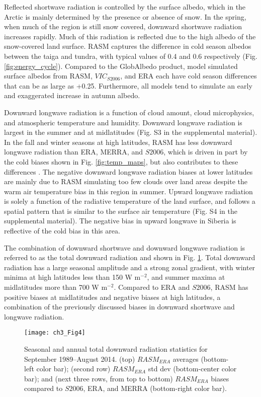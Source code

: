 Reflected shortwave radiation is controlled by the surface albedo, which in the Arctic is mainly determined by the presence or absence of snow.
In the spring, when much of the region is still snow covered, downward shortwave radiation increases rapidly.
Much of this radiation is reflected due to the high albedo of the snow-covered land surface.
RASM captures the difference in cold season albedos between the taiga and tundra, with typical values of 0.4 and 0.6 respectively (Fig. \ref{fig:energy_cycle}).
Compared to the GlobAlbedo product, model simulated surface albedos from RASM, $VIC_{S2006}$, and ERA each have cold season differences that can be as large as +0.25.
Furthermore, all models tend to simulate an early and exaggerated increase in autumn albedo.

Downward longwave radiation is a function of cloud amount, cloud microphysics, and atmospheric temperature and humidity.
Downward longwave radiation is largest in the summer and at midlatitudes (Fig. S3 in the supplemental material).
In the fall and winter seasons at high latitudes, RASM has less downward longwave radiation than ERA, MERRA, and $S2006$, which is driven in part by the cold biases shown in Fig. \ref{fig:temp_maps}, but also contributes to these differences \citep{Cassano_2016}.
The negative downward longwave radiation biases at lower latitudes are mainly due to RASM simulating too few clouds over land areas despite the warm air temperature bias in this region in summer.
Upward longwave radiation is solely a function of the radiative temperature of the land surface, and follows a spatial pattern that is similar to the surface air temperature (Fig. S4 in the supplemental material).
The negative bias in upward longwave in Siberia is reflective of the cold bias in this area.

The combination of downward shortwave and downward longwave radiation is referred to as the total downward radiation and shown in Fig. \ref{fig:drad_maps}.
Total downward radiation has a large seasonal amplitude and a strong zonal gradient, with winter minima at high latitudes less than 150 W m$^{−2}$, and summer maxima at midlatitudes more than 700 W m$^{−2}$.
Compared to ERA and $S2006$, RASM has positive biases at midlatitudes and negative biases at high latitudes, a combination of the previously discussed biases in downward shortwave and longwave radiation.

\begin{figure}
  \centering
  \texttt{[image: ch3\_Fig4]}
  \caption{Seasonal and annual total downward radiation statistics for September 1989–August 2014.
  (top) $RASM_{ERA}$ averages (bottom-left color bar); (second row) $RASM_{ERA}$ std dev (bottom-center color bar); and (next three rows, from top to bottom) $RASM_{ERA}$ biases compared to $S2006$, ERA, and MERRA (bottom-right color bar).}
  \label{fig:drad_maps}
\end{figure}

